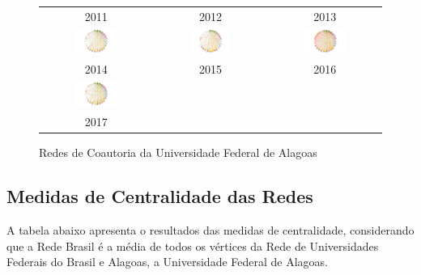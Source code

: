 \documentclass[12pt]{article}
\begin{document}
\begin{figure}[H]
\begin{tabular}{ccc}
2011 & 2012 & 2013\\[6pt]
\includegraphics[width=0.38\textwidth]{images/rede-al-2014.pdf} &
\includegraphics[width=0.38\textwidth]{images/rede-al-2015.pdf} &
\includegraphics[width=0.38\textwidth]{images/rede-al-2016.pdf} \\
2014 & 2015 & 2016\\[6pt]  \includegraphics[width=0.38\textwidth]{images/rede-al-2017.pdf} & & \\
2017 & & \\
\end{tabular}
\caption{Redes de Coautoria da Universidade Federal de Alagoas}
\end{figure}

\subsection{Medidas de Centralidade das Redes}

A tabela abaixo apresenta o resultados das medidas de centralidade, considerando que a Rede Brasil é a média de todos os vértices da Rede de Universidades Federais do Brasil e Alagoas, a Universidade Federal de Alagoas.
\end{document}
